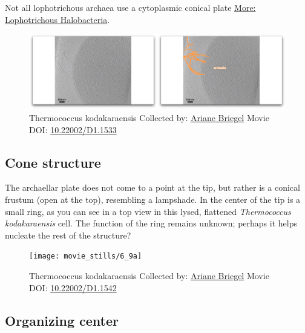 \documentclass[]{tufte-book}
\begin{document}
Not all lophotrichous archaea use a cytoplasmic conical plate
\protect\hyperlink{}{More: Lophotrichous Halobacteria}.





\begin{figure}
\includegraphics{movie_stills/6_9} \caption[Thermococcus kodakaraensis Collected by:
\protect\hyperlink{ariane_briegel}{Ariane Briegel} Movie DOI:
\href{https://doi.org/10.22002/D1.1533}{10.22002/D1.1533}]{Thermococcus kodakaraensis Collected by:
\protect\hyperlink{ariane_briegel}{Ariane Briegel} Movie DOI:
\href{https://doi.org/10.22002/D1.1533}{10.22002/D1.1533}}\label{fig:6-9}
\end{figure}

\hypertarget{Cone_structure}{\subsection{Cone
structure}\label{Cone_structure}}

The archaellar plate does not come to a point at the tip, but rather is
a conical frustum (open at the top), resembling a lampshade. In the
center of the tip is a small ring, as you can see in a top view in this
lysed, flattened \emph{Thermococcus kodakaraensis} cell. The function of
the ring remains unknown; perhaps it helps nucleate the rest of the
structure?





\begin{figure}
\texttt{[image: movie\_stills/6\_9a]} \caption[Thermococcus kodakaraensis Collected by:
\protect\hyperlink{ariane_briegel}{Ariane Briegel} Movie DOI:
\href{https://doi.org/10.22002/D1.1542}{10.22002/D1.1542}]{Thermococcus kodakaraensis Collected by:
\protect\hyperlink{ariane_briegel}{Ariane Briegel} Movie DOI:
\href{https://doi.org/10.22002/D1.1542}{10.22002/D1.1542}}\label{fig:6-9a}
\end{figure}

\hypertarget{Organizing_center}{\subsection{Organizing
center}\label{Organizing_center}}
\end{document}
